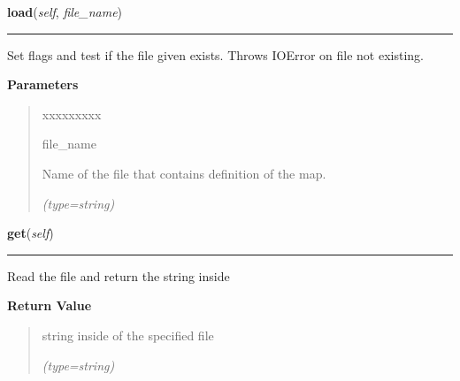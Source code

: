 \hspace{.8\funcindent}\begin{boxedminipage}{\funcwidth}

    \raggedright \textbf{load}(\textit{self}, \textit{file\_name})

    \vspace{-1.5ex}

    \rule{\textwidth}{0.5\fboxrule}
\setlength{\parskip}{2ex}
    Set flags and test if the file given exists. Throws IOError on file not
    existing.

\setlength{\parskip}{1ex}
      \textbf{Parameters}
      \vspace{-1ex}

      \begin{quote}
        \begin{Ventry}{xxxxxxxxx}

          \item[file\_name]

          Name of the file that contains definition of the map.

            {\it (type=string)}

        \end{Ventry}

      \end{quote}

    \end{boxedminipage}

    \label{UnBlockMeSolver:Map:MapReader:MapReader:get}

    \vspace{0.5ex}

\hspace{.8\funcindent}\begin{boxedminipage}{\funcwidth}

    \raggedright \textbf{get}(\textit{self})

    \vspace{-1.5ex}

    \rule{\textwidth}{0.5\fboxrule}
\setlength{\parskip}{2ex}
    Read the file and return the string inside

\setlength{\parskip}{1ex}
      \textbf{Return Value}
    \vspace{-1ex}

      \begin{quote}
      string inside of the specified file

      {\it (type=string)}

      \end{quote}

    \end{boxedminipage}


